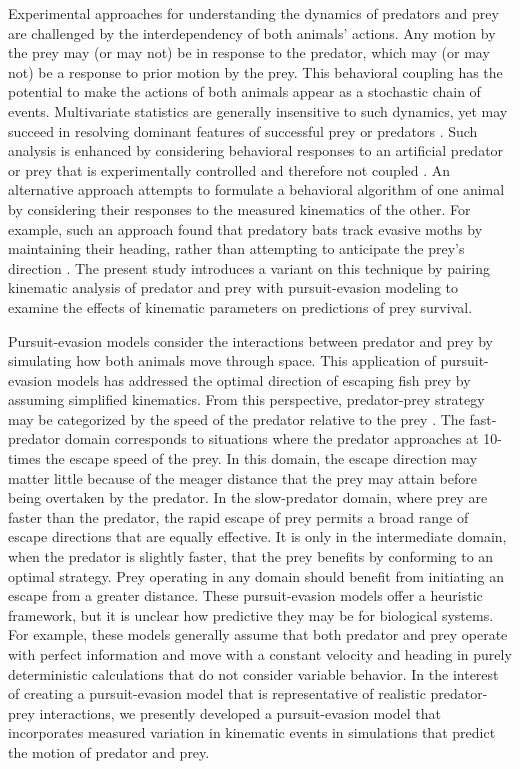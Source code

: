 \documentclass[]{rsos}%
\begin{document}
Experimental approaches for understanding the dynamics of predators and prey are challenged by the interdependency of both animals' actions.
Any motion by the prey may (or may not) be in response to the predator, which may (or may not) be a response to prior motion by the prey. 
This behavioral coupling has the potential to make the actions of both animals appear as a stochastic chain of events.
Multivariate statistics are generally insensitive to such dynamics, yet may succeed in resolving dominant features of successful prey \cite{Walker:2005vn} or predators \cite{Wainwright:2001ufa}.
Such analysis is enhanced by considering behavioral responses to an artificial predator or prey that is experimentally controlled and therefore not coupled \cite{Gabbiani:1999wz,Stewart:2014cma,Heuch:2007kk}.
An alternative approach attempts to formulate a behavioral algorithm of one animal by considering their responses to the measured kinematics of the other.
For example, such an approach found that predatory bats track evasive moths by maintaining their heading, rather than attempting to anticipate the prey's direction \cite{Ghose:2006dk}. 
The present study introduces a variant on this technique by pairing kinematic analysis of predator and prey with pursuit-evasion modeling to examine the effects of kinematic parameters on predictions of prey survival.

Pursuit-evasion models consider the interactions between predator and prey by simulating how both animals move through space.
This application of pursuit-evasion models has addressed the optimal direction of escaping fish prey \cite{Weihs:1984tb} by assuming simplified kinematics.
From this perspective, predator-prey strategy may be categorized by the speed of the predator relative to the prey \cite{Soto:2015cj}. 
The fast-predator domain corresponds to situations where the predator approaches at 10-times the escape speed of the prey.
In this domain, the escape direction may matter little because of the meager distance that the prey may attain before being overtaken by the predator.
In the slow-predator domain, where prey are faster than the predator, the rapid escape of prey permits a broad range of escape directions that are equally effective.
It is only in the intermediate domain, when the predator is slightly faster, that the prey benefits by conforming to an optimal strategy.
Prey operating in any domain should benefit from initiating an escape from a greater distance.
These pursuit-evasion models offer a heuristic framework, but it is unclear how predictive they may be for biological systems. 
For example, these models generally assume that both predator and prey operate with perfect information and move with a constant velocity and heading in purely deterministic calculations that do not consider variable behavior.
In the interest of creating a pursuit-evasion model that is representative of realistic predator-prey interactions, we presently developed a pursuit-evasion model that incorporates measured variation in kinematic events in simulations that predict the motion of predator and prey. 
\end{document}
